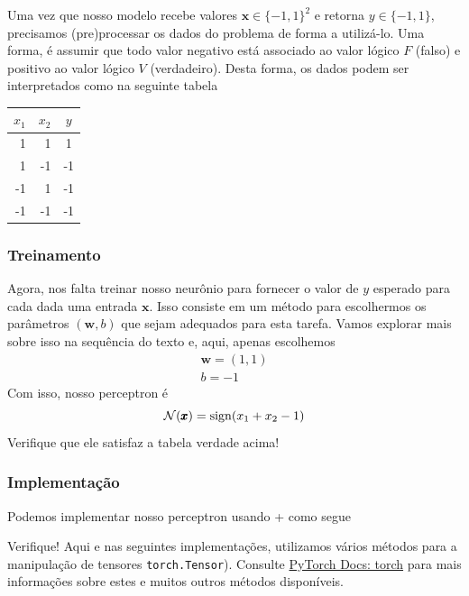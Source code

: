 Uma vez que nosso modelo recebe valores $\pmb{x}\in \{-1,1\}^2$ e retorna $y\in\{-1,1\}$, precisamos (pre)processar os dados do problema de forma a utilizá-lo. Uma forma, é assumir que todo valor negativo está associado ao valor lógico $F$ (falso) e positivo ao valor lógico $V$ (verdadeiro). Desta forma, os dados podem ser interpretados como na seguinte tabela

\begin{center}
  \begin{tabular}{rr|c}
    $x_1$ & $x_2$ & $y$\\\hline
    1 & 1 & 1\\
    1 & -1 & -1\\
    -1 & 1 & -1\\
    -1 & -1 & -1\\\hline
  \end{tabular}
\end{center}
    
    
\subsubsection{Treinamento}

Agora, nos falta treinar nosso neurônio para fornecer o valor de $y$ esperado para cada dada uma entrada $\pmb{x}$. Isso consiste em um método para escolhermos os parâmetros $(\pmb{w},b)$ que sejam adequados para esta tarefa. Vamos explorar mais sobre isso na sequência do texto e, aqui, apenas escolhemos
\begin{gather}
  \pmb{w} = (1, 1)\\
  b = -1
\end{gather}
Com isso, nosso perceptron é
\begin{equation}
  \mathcal{N}(\pmb{x}) = \operatorname{sign}(x_1 + x_2 - 1)
\end{equation}
Verifique que ele satisfaz a tabela verdade acima!


\subsubsection{Implementação}

\ifispython
Podemos implementar nosso perceptron usando {\python}+{\pytorch} como segue



Verifique! Aqui e nas seguintes implementações, utilizamos vários métodos para a manipulação de tensores \lstinline+torch.Tensor+). Consulte \href{https://pytorch.org/docs/stable/torch.html}{PyTorch Docs: torch} para mais informações sobre estes e muitos outros métodos disponíveis.
\fi

